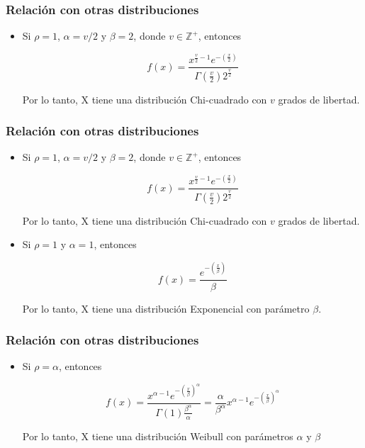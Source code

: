 \begin{frame}
    \frametitle{Relación con otras distribuciones}

    \begin{itemize}
        \item Si $\rho = 1$, $\alpha = v/2$ y $\beta = 2$, donde $v \in \mathbb{Z}^+$, entonces

        \begin{equation*}
            f(x) = \frac{x^{\frac{v}{2} - 1} e^{-(\frac{x}{2})}}{\Gamma (\frac{v}{2} ) 2^\frac{v}{2}}
        \end{equation*}

        Por lo tanto, X tiene una distribución Chi-cuadrado con $v$ grados de libertad.
    \end{itemize}
\end{frame}

\begin{frame}
    \frametitle{Relación con otras distribuciones}

    \begin{itemize}
        \item Si $\rho = 1$, $\alpha = v/2$ y $\beta = 2$, donde $v \in \mathbb{Z}^+$, entonces

        \begin{equation*}
            f(x) = \frac{x^{\frac{v}{2} - 1} e^{-(\frac{x}{2})}}{\Gamma (\frac{v}{2} ) 2^\frac{v}{2}}
        \end{equation*}

        Por lo tanto, X tiene una distribución Chi-cuadrado con $v$ grados de libertad.

        \vspace{0.5cm}

        \item Si $\rho = 1$ y $\alpha = 1$, entonces

        \begin{equation*}
            f(x) = \frac{e^{-(\frac{x}{\beta})}}{\beta}
        \end{equation*}

        Por lo tanto, X tiene una distribución Exponencial con parámetro $\beta$.
    \end{itemize}

    \cite{class}
\end{frame}

\begin{frame}
    \frametitle{Relación con otras distribuciones}

    \begin{itemize}
        \item Si $\rho = \alpha$, entonces

        \begin{equation*}
            f(x) = \frac{x^{\alpha - 1} e^{-(\frac{x}{\beta})^{\alpha}}}{\Gamma (1) \frac{\beta^\alpha}{\alpha}}
            = \frac{\alpha}{\beta^\alpha} x^{\alpha - 1} e^{- \left( \frac{x}{\beta}\right) ^ \alpha}
        \end{equation*}

        Por lo tanto, X tiene una distribución Weibull con parámetros $\alpha$ y $\beta$
    \end{itemize}
\end{frame}

